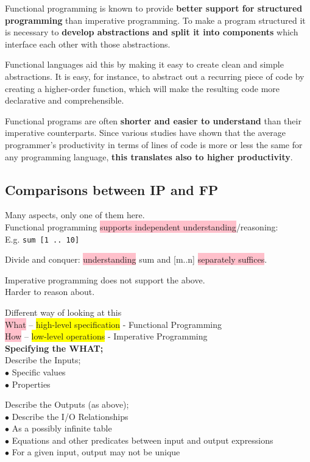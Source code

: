 \documentclass[tikz,border=10pt]{project_plan}
\newcommand{\bulletPoint}{\hspace{-3.1pt}$\bullet$ \hspace{5pt}}
\begin{document}
Functional programming is known to provide \textbf{better support for structured programming}
than imperative programming. To make a program structured it is necessary to
\textbf{develop abstractions and split it into components} which interface each
other with those abstractions.

Functional languages aid this by making it easy to create clean and simple abstractions.
It is easy, for instance, to abstract out a recurring piece of code by
creating a higher-order function, which will make the resulting code more
declarative and comprehensible.

Functional programs are often \textbf{shorter and easier to understand} than their
imperative counterparts. Since various studies have shown that the average
programmer's productivity in terms of lines of code is more or less the same
for any programming language, \textbf{this translates also to higher productivity}.

\subsection{Comparisons between IP and FP}

Many aspects, only one of them here.\\
Functional programming \colorbox{pink}{supports independent understanding}/reasoning:\\
E.g. \lstinline|sum [1 .. 10]|

Divide and conquer: \colorbox{pink}{understanding} sum and [m..n] \colorbox{pink}{separately suffices}.

Imperative programming does not support the above.\\
Harder to reason about.

Different way of looking at this\\
\colorbox{pink}{What} – \colorbox{yellow}{high-level specification} - Functional Programming\\
\colorbox{pink}{How} – \colorbox{yellow}{low-level operations} - Imperative Programming\\

\textbf{Specifying the WHAT;}\\

Describe the Inputs;\\
\bulletPoint Specific values\\
\bulletPoint Properties

Describe the Outputs (as above);\\
\bulletPoint Describe the I/O Relationships\\
\bulletPoint As a possibly infinite table\\
\bulletPoint Equations and other predicates between input and output expressions\\
\bulletPoint For a given input, output may not be unique
\end{document}

